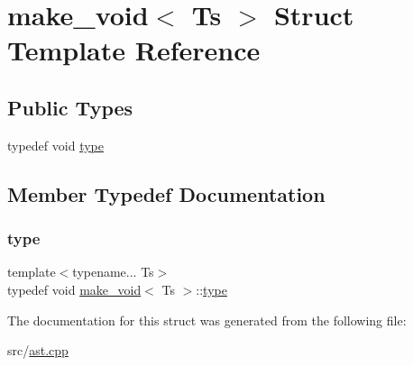 \hypertarget{structmake__void}{}\section{make\+\_\+void$<$ Ts $>$ Struct Template Reference}
\label{structmake__void}
\subsection*{Public Types}
\begin{DoxyCompactItemize}
\item 
typedef void \hyperlink{structmake__void_a5ffb1bd5095143a5816c7a881f2da8e8}{type}
\end{DoxyCompactItemize}


\subsection{Member Typedef Documentation}
\mbox{\label{structmake__void_a5ffb1bd5095143a5816c7a881f2da8e8}} 
\subsubsection{\texorpdfstring{type}{type}}
{\footnotesize\ttfamily template$<$typename... Ts$>$ \\
typedef void \hyperlink{structmake__void}{make\+\_\+void}$<$ Ts $>$\+::\hyperlink{structmake__void_a5ffb1bd5095143a5816c7a881f2da8e8}{type}}



The documentation for this struct was generated from the following file\+:\begin{DoxyCompactItemize}
\item 
src/\hyperlink{ast_8cpp}{ast.\+cpp}\end{DoxyCompactItemize}
